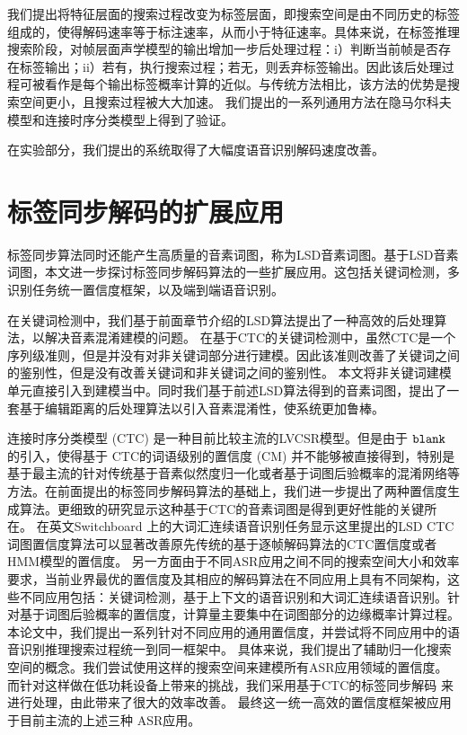 我们提出将特征层面的搜索过程改变为标签层面，即搜索空间是由不同历史的标签组成的，使得解码速率等于标注速率，从而小于特征速率。具体来说，在标签推理搜索阶段，对帧层面声学模型的输出增加一步后处理过程：i）判断当前帧是否存在标签输出；ii）若有，执行搜索过程；若无，则丢弃标签输出。因此该后处理过程可被看作是每个输出标签概率计算的近似。与传统方法相比，该方法的优势是搜索空间更小，且搜索过程被大大加速。
我们提出的一系列通用方法在隐马尔科夫模型和连接时序分类模型上得到了验证。
%

在实验部分，我们提出的系统取得了大幅度语音识别解码速度改善。


\section{标签同步解码的扩展应用}
\label{chap:sum-unify}
标签同步算法同时还能产生高质量的音素词图，称为LSD音素词图。基于LSD音素词图，本文进一步探讨标签同步解码算法的一些扩展应用。这包括关键词检测，多识别任务统一置信度框架，以及端到端语音识别。

在关键词检测中，我们基于前面章节介绍的LSD算法提出了一种高效的后处理算法，以解决音素混淆建模的问题。
在基于CTC的关键词检测中，虽然CTC是一个序列级准则，但是并没有对非关键词部分进行建模。因此该准则改善了关键词之间的鉴别性，但是没有改善关键词和非关键词之间的鉴别性。
本文将非关键词建模单元直接引入到建模当中。同时我们基于前述LSD算法得到的音素词图，提出了一套基于编辑距离的后处理算法以引入音素混淆性，使系统更加鲁棒。

连接时序分类模型 (CTC) 是一种目前比较主流的LVCSR模型。但是由于 $\tt blank$ 的引入，使得基于 CTC的词语级别的置信度 (CM) 并不能够被直接得到，特别是基于最主流的针对传统基于音素似然度归一化或者基于词图后验概率的混淆网络等方法。在前面提出的标签同步解码算法的基础上，我们进一步提出了两种置信度生成算法。更细致的研究显示这种基于CTC的音素词图是得到更好性能的关键所在。
在英文Switchboard 上的大词汇连续语音识别任务显示这里提出的LSD CTC 词图置信度算法可以显著改善原先传统的基于逐帧解码算法的CTC置信度或者 HMM模型的置信度。
%
另一方面由于不同ASR应用之间不同的搜索空间大小和效率要求，当前业界最优的置信度及其相应的解码算法在不同应用上具有不同架构，这些不同应用包括：关键词检测，基于上下文的语音识别和大词汇连续语音识别。针对基于词图后验概率的置信度，计算量主要集中在词图部分的边缘概率计算过程。本论文中，我们提出一系列针对不同应用的通用置信度，并尝试将不同应用中的语音识别推理搜索过程统一到同一框架中。
%
具体来说，我们提出了辅助归一化搜索空间的概念。我们尝试使用这样的搜索空间来建模所有ASR应用领域的置信度。 %
而针对这样做在低功耗设备上带来的挑战，我们采用基于CTC的标签同步解码\cite{Chen+2016} 来进行处理，由此带来了很大的效率改善。
最终这一统一高效的置信度框架被应用于目前主流的上述三种 ASR应用。

